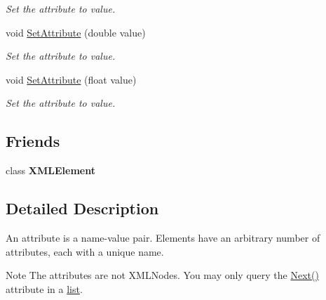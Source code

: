 \begin{DoxyCompactItemize}
\begin{DoxyCompactList}\small\item\em Set the attribute to value. \end{DoxyCompactList}\item 
\mbox{\label{classtinyxml2_1_1XMLAttribute_a9a65ab3147abe8ccbbd373ce8791e818}} 
void \hyperlink{classtinyxml2_1_1XMLAttribute_a9a65ab3147abe8ccbbd373ce8791e818}{Set\+Attribute} (double value)
\begin{DoxyCompactList}\small\item\em Set the attribute to value. \end{DoxyCompactList}\item 
\mbox{\label{classtinyxml2_1_1XMLAttribute_ae95e843313aaf5d56c32530b6456df02}} 
void \hyperlink{classtinyxml2_1_1XMLAttribute_ae95e843313aaf5d56c32530b6456df02}{Set\+Attribute} (float value)
\begin{DoxyCompactList}\small\item\em Set the attribute to value. \end{DoxyCompactList}\end{DoxyCompactItemize}
\subsection*{Friends}
\begin{DoxyCompactItemize}
\item 
\mbox{\label{classtinyxml2_1_1XMLAttribute_afda4b2e340326fca89dc9edbd505cb3b}} 
class {\bfseries X\+M\+L\+Element}
\end{DoxyCompactItemize}


\subsection{Detailed Description}
An attribute is a name-\/value pair. Elements have an arbitrary number of attributes, each with a unique name.

\begin{DoxyNote}{Note}
The attributes are not X\+M\+L\+Nodes. You may only query the \hyperlink{classtinyxml2_1_1XMLAttribute_aee53571b21e7ce5421eb929523a8bbe6}{Next()} attribute in a \hyperlink{protocollist-p}{list}. 
\end{DoxyNote}


